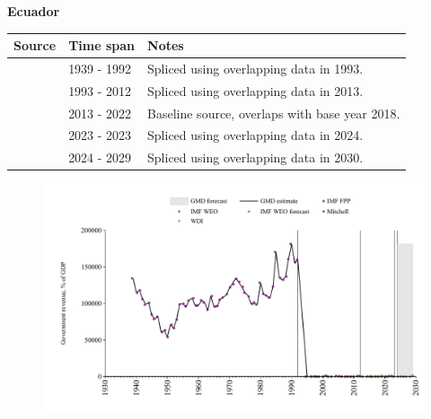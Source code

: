 \documentclass[12pt,a4paper,landscape]{article}
\begin{document}
\begin{adjustbox}{max totalsize={\paperwidth}{\paperheight},center}
\begin{minipage}[t][\textheight][t]{\textwidth}
\vspace*{0.5cm}
{}
\begin{center}
{\Large\bfseries Ecuador}
\end{center}
\vspace{0.5cm}
\begin{table}[H]
\centering
\small
\begin{tabular}{|l|l|l|}
\hline
\textbf{Source} & \textbf{Time span} & \textbf{Notes} \\
\hline
\rowcolor{white}\cite{Mitchell}& 1939 - 1992 &Spliced using overlapping data in 1993.\\
\rowcolor{lightgray}\cite{IMF_WEO}& 1993 - 2012 &Spliced using overlapping data in 2013.\\
\rowcolor{white}\cite{WDI}& 2013 - 2022 &Baseline source, overlaps with base year 2018.\\
\rowcolor{lightgray}\cite{IMF_FPP}& 2023 - 2023 &Spliced using overlapping data in 2024.\\
\rowcolor{white}\cite{IMF_WEO_forecast}& 2024 - 2029 &Spliced using overlapping data in 2030.\\
\hline
\end{tabular}
\end{table}
\begin{figure}[H]
\centering
\includegraphics[width=\textwidth,height=0.6\textheight,keepaspectratio]{graphs/ECU_govrev_GDP.pdf}
\end{figure}
\end{minipage}
\end{adjustbox}
\end{document}
